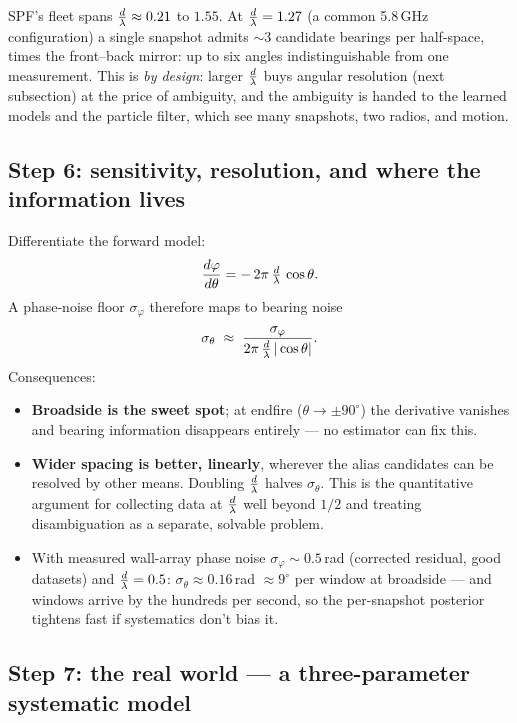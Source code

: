 SPF's fleet spans $\tfrac{d}{\lambda} \approx 0.21$ to $1.55$. At $\tfrac{d}{\lambda} = 1.27$ (a common
5.8\,GHz configuration) a single snapshot admits $\sim$3 candidate bearings
per half-space, times the front--back mirror: up to six angles indistinguishable
from one measurement. This is \emph{by design}: larger $\tfrac{d}{\lambda}$ buys angular
resolution (next subsection) at the price of ambiguity, and the ambiguity is
handed to the learned models and the particle filter, which see many
snapshots, two radios, and motion.

\subsection{Step 6: sensitivity, resolution, and where the information lives}
\label{sec:sensitivity}

Differentiate the forward model:
\[
\frac{d\varphi}{d\theta} = -\,2\pi\,\tfrac{d}{\lambda}\,\cos\theta .
\]
A phase-noise floor $\sigma_\varphi$ therefore maps to bearing noise
\[
\sigma_\theta \;\approx\; \frac{\sigma_\varphi}{2\pi\,\tfrac{d}{\lambda}\,|\cos\theta|}.
\]
Consequences:
\begin{itemize}
  \item \textbf{Broadside is the sweet spot}; at endfire
        ($\theta \to \pm 90^\circ$) the derivative vanishes and bearing
        information disappears entirely --- no estimator can fix this.
  \item \textbf{Wider spacing is better, linearly}, wherever the alias
        candidates can be resolved by other means. Doubling $\tfrac{d}{\lambda}$ halves
        $\sigma_\theta$. This is the quantitative argument for collecting
        data at $\tfrac{d}{\lambda}$ well beyond $1/2$ and treating disambiguation as a
        separate, solvable problem.
  \item With measured wall-array phase noise $\sigma_\varphi \sim 0.5$\,rad
        (corrected residual, good datasets) and $\tfrac{d}{\lambda} = 0.5$:
        $\sigma_\theta \approx 0.16$\,rad $\approx 9^\circ$ per window at
        broadside --- and windows arrive by the hundreds per second, so the
        per-snapshot posterior tightens fast if systematics don't bias it.
\end{itemize}

\subsection{Step 7: the real world --- a three-parameter systematic model}
\label{sec:systematics}

